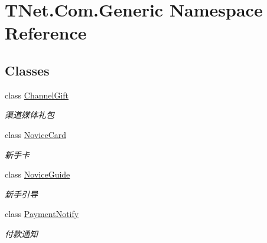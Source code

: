 \hypertarget{namespace_t_net_1_1_com_1_1_generic}{}\section{T\+Net.\+Com.\+Generic Namespace Reference}
\label{namespace_t_net_1_1_com_1_1_generic}
\subsection*{Classes}
\begin{DoxyCompactItemize}
\item 
class \mbox{\hyperlink{class_t_net_1_1_com_1_1_generic_1_1_channel_gift}{Channel\+Gift}}
\begin{DoxyCompactList}\small\item\em 渠道媒体礼包 \end{DoxyCompactList}\item 
class \mbox{\hyperlink{class_t_net_1_1_com_1_1_generic_1_1_novice_card}{Novice\+Card}}
\begin{DoxyCompactList}\small\item\em 新手卡 \end{DoxyCompactList}\item 
class \mbox{\hyperlink{class_t_net_1_1_com_1_1_generic_1_1_novice_guide}{Novice\+Guide}}
\begin{DoxyCompactList}\small\item\em 新手引导 \end{DoxyCompactList}\item 
class \mbox{\hyperlink{class_t_net_1_1_com_1_1_generic_1_1_payment_notify}{Payment\+Notify}}
\begin{DoxyCompactList}\small\item\em 付款通知 \end{DoxyCompactList}\end{DoxyCompactItemize}
